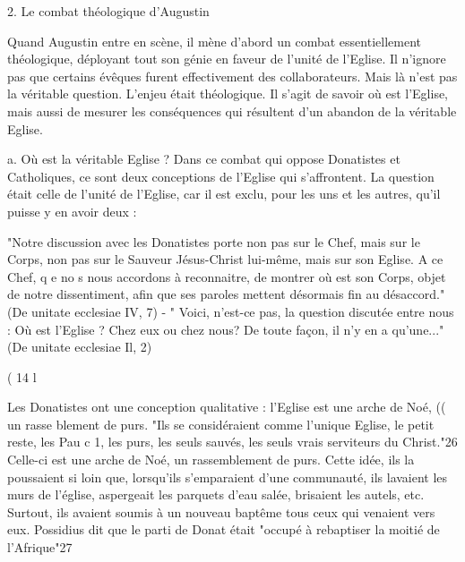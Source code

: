 2.	Le combat théologique d'Augustin

Quand Augustin entre en scène, il mène d'abord un combat essentiellement théologique, déployant tout son génie en faveur de l'unité de l'Eglise. Il n'ignore pas que certains évêques furent effectivement des collaborateurs. Mais là n'est pas la véritable question. L'enjeu était théologique. Il s'agit de savoir où est l'Eglise, mais aussi de mesurer les conséquences qui résultent d'un abandon de la véritable Eglise.

a.	Où est la	véritable Eglise	? Dans ce combat qui oppose Donatistes et Catholiques, ce sont deux conceptions de l'Eglise qui s'affrontent. La question était celle
de l'unité de l'Eglise, car il est exclu, pour les uns et les autres, qu'il puisse y en avoir deux :

"Notre discussion avec les Donatistes porte non pas sur le Chef, mais sur le Corps, non pas sur le Sauveur Jésus-Christ lui-même, mais sur son Eglise. A ce Chef, q e no s nous accordons à reconnaitre, de montrer où est son Corps, objet de notre dissentiment, afin que ses paroles mettent désormais fin au désaccord." (De
unitate ecclesiae IV, 7) -
" Voici, n'est-ce pas, la question discutée entre nous : Où est l'Eglise ? Chez eux ou chez nous? De toute façon, il n'y en a qu'une..." (De unitate ecclesiae Il, 2)


(	14
l
 
 	Les Donatistes ont une conception qualitative : l'Eglise est une arche de Noé,	(( un rasse blement de purs.  "Ils se considéraient comme l'unique Eglise, le petit reste,
les Pau c 1, les purs, les seuls sauvés, les seuls vrais serviteurs du Christ."26 Celle-ci est une arche de Noé, un rassemblement de purs. Cette idée, ils la poussaient si loin que, lorsqu'ils s'emparaient d'une communauté, ils lavaient les murs de l'église, aspergeait les parquets d'eau salée, brisaient les autels, etc. Surtout, ils avaient soumis à un nouveau baptême tous ceux qui venaient vers eux. Possidius dit que le parti de Donat était "occupé à rebaptiser la moitié de l'Afrique"27

